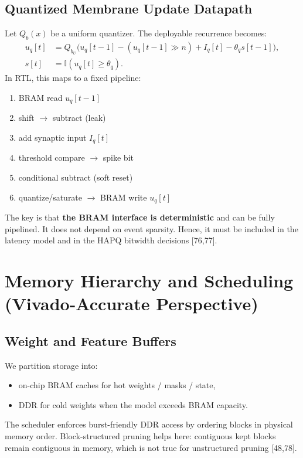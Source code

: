 \documentclass[10pt,journal,compsoc]{IEEEtran}
\begin{document}
\subsection{Quantized Membrane Update Datapath}
Let $Q_{b}(x)$ be a uniform quantizer. The deployable recurrence becomes:
\begin{equation}
\begin{aligned}
u_q[t] &= Q_{b_U}\Big(
u_q[t-1] - (u_q[t-1]\gg n) + I_q[t] - \theta_q s[t-1]
\Big), \\
s[t] &= \mathbb{I}(u_q[t]\ge \theta_q).
\end{aligned}
\end{equation}
In RTL, this maps to a fixed pipeline:
\begin{enumerate}
    \item BRAM read $u_q[t-1]$
    \item shift $\to$ subtract (leak)
    \item add synaptic input $I_q[t]$
    \item threshold compare $\to$ spike bit
    \item conditional subtract (soft reset)
    \item quantize/saturate $\to$ BRAM write $u_q[t]$
\end{enumerate}
The key is that \textbf{the BRAM interface is deterministic} and can be fully pipelined. It does not depend on event sparsity. Hence, it must be included in the latency model and in the HAPQ bitwidth decisions [76,77].

\section{Memory Hierarchy and Scheduling (Vivado-Accurate Perspective)}

\subsection{Weight and Feature Buffers}
We partition storage into:
\begin{itemize}
    \item on-chip BRAM caches for hot weights / masks / state,
    \item DDR for cold weights when the model exceeds BRAM capacity.
\end{itemize}
The scheduler enforces burst-friendly DDR access by ordering blocks in physical memory order. Block-structured pruning helps here: contiguous kept blocks remain contiguous in memory, which is not true for unstructured pruning [48,78].
\end{document}
